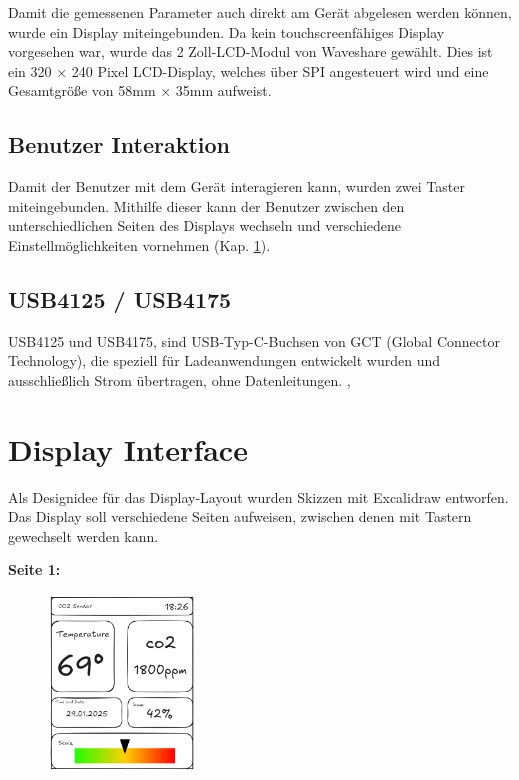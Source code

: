 \begin{inhalt}
Damit die gemessenen Parameter auch direkt am Gerät abgelesen werden können, wurde ein Display miteingebunden. Da kein touchscreenfähiges Display vorgesehen war, wurde das 2 Zoll-LCD-Modul von Waveshare gewählt. Dies ist ein 320 × 240 Pixel LCD-Display, welches über SPI angesteuert wird und eine Gesamtgröße von 58mm × 35mm aufweist. \cite{LCDDisplayWiki}

\subsection{Benutzer Interaktion} \label{sec:Benutzer_Interaktionen}

Damit der Benutzer mit dem Gerät interagieren kann, wurden zwei Taster miteingebunden. Mithilfe dieser kann der Benutzer zwischen den unterschiedlichen Seiten des Displays wechseln und verschiedene Einstellmöglichkeiten vornehmen (Kap. \ref{sec:display interface}).

\subsection{USB4125 / USB4175} \label{sec:USB4125_75}

USB4125 und USB4175, sind USB-Typ-C-Buchsen von GCT (Global Connector Technology), die speziell für Ladeanwendungen entwickelt wurden und ausschließlich Strom übertragen, ohne Datenleitungen. \cite{USB4125}, \cite{USB4175}

\section{Display Interface} \label{sec:display interface}

Als Designidee für das Display-Layout wurden Skizzen mit Excalidraw \cite{Excalidraw} entworfen. Das Display soll verschiedene Seiten aufweisen, zwischen denen mit Tastern gewechselt werden kann. 

\smallskip

\begin{center}
    \textbf{Seite 1:}
\end{center}

\begin{figure}[!htb]
\centering
\includegraphics[width=0.35\textwidth]{files/Tobias/pics/Skizzen/Screen1_Sensor_Info.png}
\caption[Display Interface Skizze (Seite 1)]{}
\label{fig:display_skizze_seite_1}
\end{figure}


\end{inhalt}

